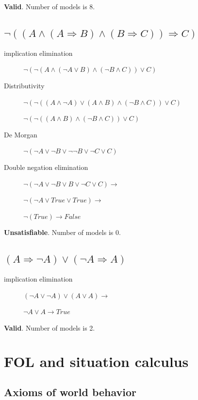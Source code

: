 \documentclass{article}                     %
\newcommand{\nt}[1]{\neg #1}
\begin{document}
		\textbf{Valid}.  Number of models is 8.

	\subsection{$ \neg ((A \land (A \Rightarrow B) \land (B \Rightarrow C)) \Rightarrow C )$}
	\begin{description}
		\item[implication elimination] 	$ \neg (\neg(A \land (\nt{A} \lor B) \land (\nt{B} \land C)) \lor C )$
		\item[Distributivity]  $ \neg (\neg((A \land \nt{A}) \lor (A \land B) \land (\nt{B} \land C)) \lor C )$
		
		$ \neg (\neg((A \land B) \land (\nt{B} \land C)) \lor C )$
		\item[De Morgan] 		$ \neg (\nt{A} \lor \nt{B} \lor \nt{\nt{B}} \lor \nt{C} \lor C )$
		\item[Double negation elimination] $ \neg (\nt{A} \lor \nt{B} \lor B \lor \nt{C} \lor C ) \rightarrow $
		
		$ \neg (\nt{A} \lor True \lor True ) \rightarrow$
		
		$ \neg (True) \rightarrow False$
	\end{description}

	\textbf{Unsatisfiable}.  Number of models is 0.
	
	\subsection{$ (A\Rightarrow \nt{A}) \lor (\nt{A} \Rightarrow A) $}
		\begin{description}
		\item[implication elimination] $ (\nt{A} \lor \nt{A}) \lor (A \lor A) \rightarrow $
		
		$ \nt{A} \lor A \rightarrow True$
		
	\end{description}

	\textbf{Valid}.  Number of models is 2.
	
	
	\section{FOL and situation calculus}		

	\subsection{Axioms of world behavior}
	
\end{document}
